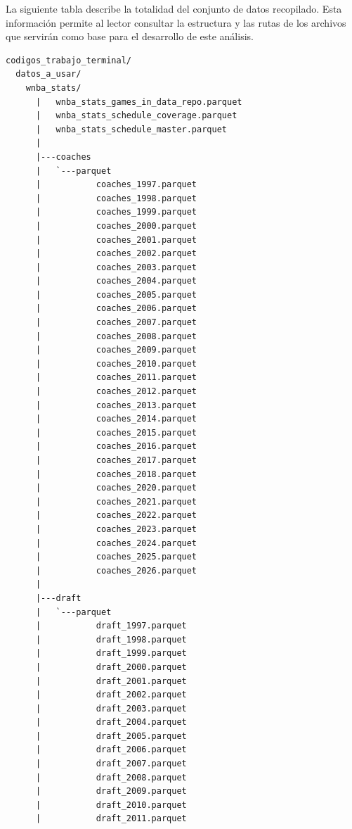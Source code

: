 La siguiente tabla describe la totalidad del conjunto de datos recopilado. Esta información permite al lector consultar la estructura y las rutas de los archivos que servirán como base para el desarrollo de este análisis.
\begingroup
{}
\begin{lstlisting}
codigos_trabajo_terminal/
  datos_a_usar/
    wnba_stats/
      |   wnba_stats_games_in_data_repo.parquet
      |   wnba_stats_schedule_coverage.parquet
      |   wnba_stats_schedule_master.parquet
      |
      |---coaches
      |   `---parquet
      |           coaches_1997.parquet
      |           coaches_1998.parquet
      |           coaches_1999.parquet
      |           coaches_2000.parquet
      |           coaches_2001.parquet
      |           coaches_2002.parquet
      |           coaches_2003.parquet
      |           coaches_2004.parquet
      |           coaches_2005.parquet
      |           coaches_2006.parquet
      |           coaches_2007.parquet
      |           coaches_2008.parquet
      |           coaches_2009.parquet
      |           coaches_2010.parquet
      |           coaches_2011.parquet
      |           coaches_2012.parquet
      |           coaches_2013.parquet
      |           coaches_2014.parquet
      |           coaches_2015.parquet
      |           coaches_2016.parquet
      |           coaches_2017.parquet
      |           coaches_2018.parquet
      |           coaches_2020.parquet
      |           coaches_2021.parquet
      |           coaches_2022.parquet
      |           coaches_2023.parquet
      |           coaches_2024.parquet
      |           coaches_2025.parquet
      |           coaches_2026.parquet
      |
      |---draft
      |   `---parquet
      |           draft_1997.parquet
      |           draft_1998.parquet
      |           draft_1999.parquet
      |           draft_2000.parquet
      |           draft_2001.parquet
      |           draft_2002.parquet
      |           draft_2003.parquet
      |           draft_2004.parquet
      |           draft_2005.parquet
      |           draft_2006.parquet
      |           draft_2007.parquet
      |           draft_2008.parquet
      |           draft_2009.parquet
      |           draft_2010.parquet
      |           draft_2011.parquet

\end{lstlisting}
